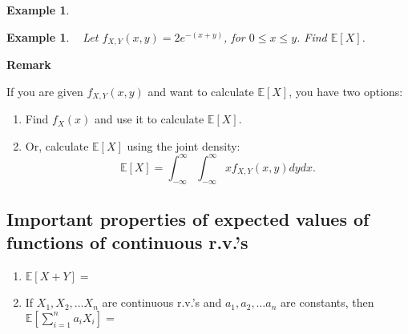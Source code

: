 \documentclass[12pt]{amsart}
\newtheorem{example}[theorem]{Example}
\newcommand\Ebb{\mathbb{E}}
\newcommand\pdfX{f_X(x)}
\newcommand\pdfXY{f_{X,Y}(x,y)}
\newcommand\intinft{\int_{-\infty}^{\infty}}
\begin{document}
{\begin{example}
\end{example}


\newpage
\begin{example}\label{28_E_joint}\ \newline
Let $\pdfXY = 2e^{-(x+y)}$, for $0 \leq x \leq y$. Find $\Ebb[X]$.

\end{example}


\vfill
\textbf{Remark}

If you are given $\pdfXY$ and want to calculate $\Ebb[X]$, you have two options:
\begin{enumerate}
\item Find $\pdfX$ and use it to calculate $\Ebb[X]$.
\item Or, calculate $\Ebb[X]$ using the joint density:
$$
\Ebb[X] = \intinft\intinft x \pdfXY dydx.
$$
\end{enumerate}

\vspace{2cm}



\newpage

\subsection{Important properties of expected values of functions of continuous r.v.'s}\hspace*{\fill}%

\begin{enumerate}
\item $\Ebb[X+Y] = $

\vspace{5cm}

\item If $X_1, X_2, \ldots X_n$ are continuous r.v.'s and $a_1, a_2, \ldots a_n$ are constants, then $\Ebb[\sum_{i=1}^{n} a_i X_i] = $


\end{enumerate}}
\end{document}
